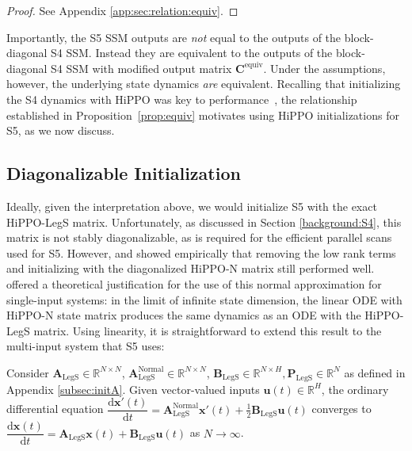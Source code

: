 \begin{proof}
See Appendix \ref{app:sec:relation:equiv}.
\end{proof}

Importantly, the S5 SSM outputs are \emph{not} equal to the outputs of the block-diagonal S4 SSM.  Instead they are equivalent to the outputs of the block-diagonal S4 SSM with modified output matrix $\mathbf{C}^{\mathrm{equiv}}$.  Under the assumptions, however, the underlying state dynamics \emph{are} equivalent.  Recalling that initializing the S4 dynamics with HiPPO was key to performance~\citep{gu2021s4}, the relationship established in Proposition~\ref{prop:equiv} motivates using HiPPO initializations for S5, as we now discuss.  

\subsection{Diagonalizable Initialization}
\label{sec:s4s5rel:diag}
Ideally, given the interpretation above, we would initialize S5 with the exact HiPPO-LegS matrix. Unfortunately, as discussed in Section \ref{background:S4}, this matrix is not stably diagonalizable, as is required for the efficient parallel scans used for S5. However, \citet{gupta2022dss} and \citet{gu2022parameterization} showed empirically that removing the low rank terms and initializing with the diagonalized HiPPO-N matrix still performed well. \citet{gu2022parameterization} offered a theoretical justification for the use of this normal approximation for single-input systems: in the limit of infinite state dimension, the linear ODE with HiPPO-N state matrix produces the same dynamics as an ODE with the HiPPO-LegS matrix.  Using linearity, it is straightforward to extend this result to the multi-input system that S5 uses:

\begin{corollary}
\label{prop:s4d_extension}
Consider $\mathbf{A}_{\mathrm{LegS}}\in \mathbb{R}^{N\times N}$, $\mathbf{A}_{\mathrm{LegS}}^{\mathrm{Normal}}\in \mathbb{R}^{N\times N}$, $\mathbf{B}_{\mathrm{LegS}}\in \mathbb{R}^{N \times H}, \mathbf{P}_{\mathrm{LegS}}\in \mathbb{R}^{N}$ as defined in Appendix \ref{subsec:initA}. Given vector-valued inputs $\mathbf{u}(t)\in \mathbb{R}^H$, the ordinary differential equation $\dfrac{\mathrm{d} \mathbf{x}'(t)}{\mathrm{d} t} = \mathbf{A}_{\mathrm{LegS}}^{\mathrm{Normal}} \mathbf{x}'(t) + \frac{1}{2}\mathbf{B}_{\mathrm{LegS}}\mathbf{u}(t)$ converges to $\dfrac{\mathrm{d} \mathbf{x}(t)}{\mathrm{d} t} = \mathbf{A}_{\mathrm{LegS}}\mathbf{x}(t) + \mathbf{B}_{\mathrm{LegS}}\mathbf{u}(t)$ as $N \rightarrow \infty$.
\end{corollary}

